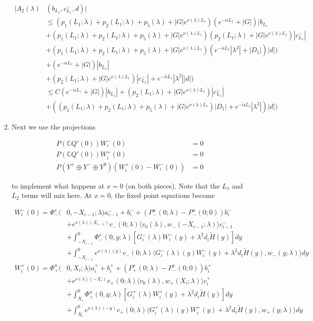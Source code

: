 \documentclass[12pt]{article}
\def\C{{\mathbb C}}
\begin{document}
\begin{enumerate}
\begin{align*}
|A_2(\lambda)&(b_{L_1}, c_{L_1}^-, d)| \\
&\leq ( p_1(L_1; \lambda) + p_2(L_1; \lambda) + p_5(\lambda) + |G|e^{\nu(\lambda)L_1})( e^{-\alpha L_1} + |G|)|b_{L_1}  \\
&+ ( p_1(L_1; \lambda) + p_2(L_1; \lambda) + p_5(\lambda) + |G|e^{\nu(\lambda)L_1})( p_2(L_1; \lambda) + |G|e^{\nu(\lambda) L_1})|c_{L_1}^-| \\
&+ ( p_1(L_1; \lambda) + p_2(L_1; \lambda) + p_5(\lambda) + |G|e^{\nu(\lambda)L_1})(e^{-\tilde{\alpha}L_1}|\lambda^2| + |D_1|)|d|) \\  
&+ ( e^{-\alpha L_1} + |G|)|b_{L_1}| \\
&+ ( p_2(L_1; \lambda) + |G|e^{\nu(\lambda)L_1})|c_{L_1}^-|+ e^{-\tilde{\alpha} L_1} |\lambda^2||d| ) \\
&\leq C( e^{-\alpha L_1} + |G|)|b_{L_1}| + ( p_2(L_1; \lambda) + |G|e^{\nu(\lambda)L_1})|c_{L_1}^-| \\
&+ (( p_1(L_1; \lambda) + p_2(L_1; \lambda) + p_5(\lambda) + |G|e^{\nu(\lambda)L_1})|D_1| + e^{-\tilde{\alpha}L_1}|\lambda^2|)|d| ) 
\end{align*}


\item Next we use the projections 

\begin{align*}
P(\C Q'(0))W_i^-(0) &= 0 \\
P(\C Q'(0))W_i^+(0) &= 0 \\
P(Y^+ \oplus Y^- \oplus Y^0) ( W_i^+(0) - W_i^-(0) ) &= 0
\end{align*}

to implement what happens at $x = 0$ (on both pieces). Note that the $L_1$ and $L_2$ terms will mix here. At $x = 0$, the fixed point equations become

\begin{align*}
W_i^-(0) = \Phi^s_-(&0, -X_{i-1}; \lambda)a_{i-1}^- + b_i^- + (P^u_-(0; \lambda) - P^u_-(0; 0))b_i^- \\
&+ e^{\nu(\lambda)(X_{i-1})} v_-(0; \lambda) \langle v_0(\lambda), w_-(-X_{i-1}; \lambda) \rangle c_{i-1}^- \\
&+ \int_{-X_{i-1}}^0 \Phi^s_-(0, y; \lambda) [ G_i^-(\lambda)W_i^-(y) + \lambda^2 d_i \tilde{H}(y) ] dy \\
&+ \int_{-X_{i-1}}^0
e^{\nu(\lambda)(y)} v_-(0; \lambda) \langle G_i^-(\lambda)(y)W_i^-(y) + \lambda^2 d_i \tilde{H}(y), w_-(y; \lambda) \rangle dy \\
W_i^+(0) = \Phi^u_+(&0, X_i; \lambda)a_i^+ + b_i^+ + (P^s_+(0; \lambda) - P^s_-(0; 0))b_i^+ \\
&+ e^{\nu(\lambda)(-X_i)} v_+(0; \lambda) \langle v_0(\lambda), w_+(X_i; \lambda) \rangle c_i^+ \\
&+ \int_{X_i}^0 \Phi^u_+(0, y; \lambda) [ G_i^+(\lambda)W_i^+(y) + \lambda^2 d_i \tilde{H}(y) ] dy \\
&+ \int_{X_i}^0 e^{\nu(\lambda)(-y)} v_+(0; \lambda) \langle G_i^+(\lambda)(y)W_i^+(y) + \lambda^2 d_i \tilde{H}(y), w_+(y; \lambda) \rangle dy
\end{align*}


\end{enumerate}
\end{document}
